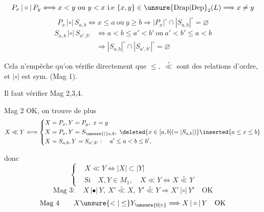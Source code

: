 \[
 P_x\,|\circ|\,P_y\Longleftrightarrow x<y\ \text{ou}\ y<x\ \text{i.e}\ 
 \{x,y\}\in\unsure{\mathrm{Drap}|\mathrm{Dep}}_2(L)\Longrightarrow x\ne y
\]
\[
 P_x\,|\circ|\,S_{a,b}\Longleftrightarrow x\leq a\ \text{ou}\ y\geq b
 \Longrightarrow |P_x|^\circ\cap|S_{a,b}|^\circ=\varnothing
\]
\[
\begin{aligned}
 S_{a,b}\,|\circ|\,S_{a',b'}&\Longleftrightarrow
 a<b\leq a'<b'\ \text{ou}\ a'<b'\leq a<b\\
 &\Longrightarrow |S_{a,b}|^\circ\cap|S_{a',b'}|^\circ=\varnothing
\end{aligned}
\]

Cela n'empêche qu'on vérifie directement que \deleted{$\unsure{\notin|\nleq}$} $\leq,\ \overset{\circ}{\ll}$ sont des relations d'ordre, et $|\circ|$ est sym.  (Mag 1).

Il faut vérifier Mag 2,3,4.

Mag 2 OK, on trouve de plus
\[
 X\ll Y\Longleftrightarrow\left\{\begin{aligned}
 &X=P_x,Y=P_y,\ x=y\\
 &X=P_x,Y=S_{\unsure{(}a,b},\ 
    \deleted{x\in[a,b](=|S_{a,b}|)}\inserted{a\leq x\leq b}\\
 &X=S_{a,b},Y=S_{a',b'}:\quad a'\leq a<b\leq b',
 \end{aligned}\right.
\]

donc
\[
 \left\{\begin{aligned}
 &X\ll Y\Longleftrightarrow |X|\subset|Y|\\
 &\text{Si}\quad X,Y\in M_1,\quad X\ll Y\Longleftrightarrow X\overset{\circ}{\ll}Y
 \end{aligned}\right.
\]
\[
 \text{Mag }3:\quad X\,|\bullet|\,Y,\ X'\overset{\circ}{\ll}X,\ 
 Y'\overset{\circ}{\ll}Y\Longrightarrow X'\,|\circ|\,Y'\quad\text{OK}
\]
\[
 \text{Mag }4\qquad X\unsure{<|\leq}Y_{\unsure{0|\circ}}\Longrightarrow X\,|\circ|\,Y\quad\text{OK}
\]


